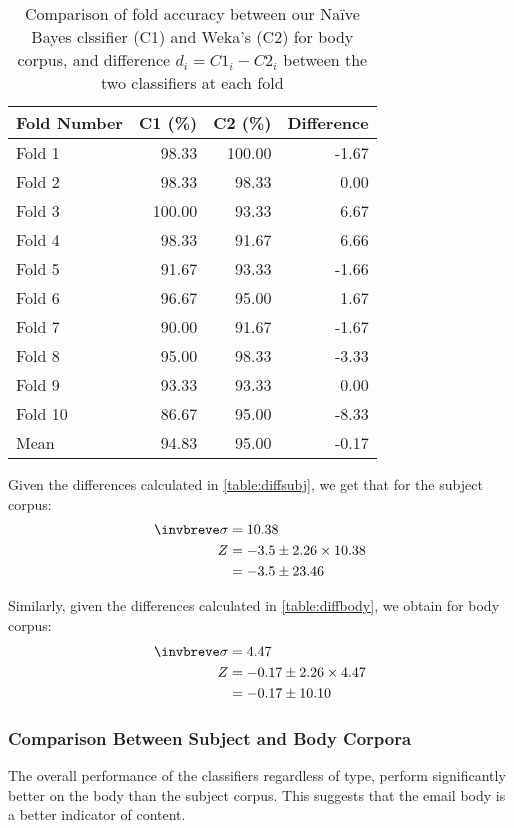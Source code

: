 \documentclass[10pt, a4paper]{article}
\begin{document}
\begin{table}[H]
\centering
\caption{Comparison of fold accuracy between our Na\"ive Bayes clssifier (C1) and Weka's (C2) for body corpus, and difference $d_{i} = C1_{i} - C2_{i}$ between the two classifiers at each fold}
\begin{tabular}{@{}lrrr@{}}
\toprule
\textbf{Fold Number} & \textbf{C1 (\%)} & \textbf{C2 (\%)}
	& \textbf{Difference} \\
\midrule
Fold 1 & 98.33 & 100.00 & -1.67 \\
Fold 2 & 98.33 & 98.33 & 0.00 \\
Fold 3 & 100.00 & 93.33 & 6.67 \\
Fold 4 & 98.33 & 91.67 & 6.66 \\
Fold 5 & 91.67 & 93.33 & -1.66 \\
Fold 6 & 96.67 & 95.00 & 1.67 \\
Fold 7 & 90.00 & 91.67 & -1.67 \\
Fold 8 & 95.00 & 98.33 & -3.33 \\
Fold 9 & 93.33 & 93.33 & 0.00 \\
Fold 10 & 86.67 & 95.00 & -8.33 \\
\bottomrule
Mean & 94.83 & 95.00 & -0.17 \\
\bottomrule
\end{tabular}
\label{table:diffbody}
\end{table}

Given the differences calculated in \autoref{table:diffsubj}, we get that for the subject corpus:
\begin{align*}
\invbreve\sigma &= 10.38 \\
Z &= -3.5 \pm 2.26 \times 10.38 \\ &= -3.5 \pm 23.46
\end{align*}

Similarly, given the differences calculated in \autoref{table:diffbody}, we obtain for body corpus:
\begin{align*}
\invbreve\sigma &= 4.47 \\
Z &= -0.17 \pm 2.26 \times 4.47 \\ &= -0.17 \pm 10.10
\end{align*}

\subsubsection{Comparison Between Subject and Body Corpora}

The overall performance of the classifiers regardless of type, perform significantly better on the body than the subject corpus. This suggests that the email body is a better indicator of content.
\end{document}
